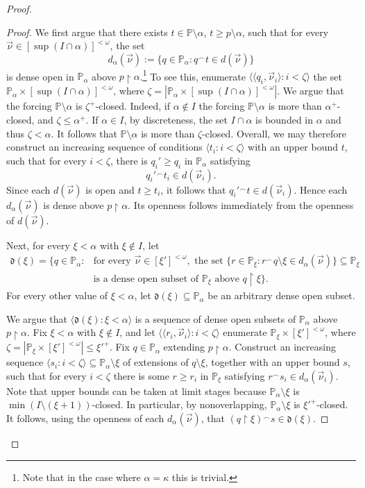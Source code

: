 \documentclass{article}
\theoremstyle{definition}
\theoremstyle{plain}
\newcommand{\po}{\mathbb{P}}
\newcommand{\la}{\langle}
\newcommand{\ra}{\rangle}
\newcommand{\uhr}{\upharpoonright}
\begin{document}
\begin{proof}
\begin{proof}
     We first argue that there exists $t\in \po\setminus\alpha$, $t\geq p\setminus\alpha$, such that for every $\vec{\nu}\in[\sup(I\cap \alpha)]^{<\omega}$, the set
$$d_\alpha(\vec{\nu}):=\{q\in\po_\alpha\colon q{}^\frown t\in d(\vec{\nu})\}$$
is dense open in $\po_\alpha$ above $p\uhr\alpha$.\footnote{Note that in the case where $\alpha = \kappa$ this is trivial.} To see this, enumerate $\langle\langle q_i,\vec{\nu}_i\rangle\colon i<\zeta\rangle$ the set $\po_\alpha\times[\sup(I\cap \alpha)]^{<\omega}$, where $\zeta  = \left|\po_\alpha\times[\sup(I\cap \alpha)]^{<\omega} \right|$. We argue that the forcing $\po\setminus\alpha$ is  $\zeta^+$-closed. Indeed, if $\alpha\notin I$ the forcing $\po\setminus \alpha$ is more than $\alpha^+$-closed, and $\zeta\leq \alpha^+$. If $\alpha\in I$, by discreteness, the set $I\cap \alpha$ is bounded in $\alpha$ and thus $\zeta<\alpha$. It follows that $\po\setminus \alpha$ is more than $\zeta$-closed. Overall, we may therefore construct an increasing sequence of conditions $\langle t_i\colon i<\zeta\rangle$ with an upper bound $t$, such that for every $i<\zeta$, there is $q_i'\geq q_i$ in $\po_\alpha$ satisfying
$$q_i'{}^\frown t_i\in d(\vec{\nu}_i).$$
Since each $d(\vec{\nu})$ is open and $t\geq t_i$, it follows that
$q_i'{}^\frown t\in d(\vec{\nu}_i)$. Hence each $d_\alpha(\vec{\nu})$ is dense above $p\uhr\alpha$. Its openness follows immediately from the openness of $d(\vec{\nu})$.
        
        Next, for every $\xi<\alpha$ with  $\xi\notin I$, let
        \begin{align*}
             \mathfrak{d}(\xi) = \{ q\in \po_\alpha \colon &\text{for every } \vec{\nu}\in [\xi']^{<\omega},\text{ the set }  \{ r\in \po_\xi \colon r{}^\frown q\setminus \xi{} \in d_\alpha(\vec{\nu}) \}\subseteq \po_{\xi} \\
             &\text{is a dense open subset of }\po_\xi \text{ above }q\uhr \xi\}. 
        \end{align*}
        For every other value of $\xi<\alpha$, let $\mathfrak{d}(\xi)\subseteq \po_\alpha$ be an arbitrary dense open subset.
        
        We argue that $\la \mathfrak{d}(\xi)\colon \xi<\alpha\ra$ is a sequence of dense open subsets of $\po_\alpha$ above $p\uhr\alpha$. Fix $\xi<\alpha$ with $\xi \notin I$, and let $\langle\la r_i,\vec{\nu}_i\rangle\colon i<\zeta\ra$ enumerate $\po_\xi\times[\xi']^{<\omega}$, where $\zeta=|\po_\xi\times [\xi']^{<\omega}|\leq {\xi'}^+$. Fix $q\in\po_\alpha$ extending $p\uhr\alpha$. Construct an increasing sequence $\langle s_i\colon i<\zeta\rangle\subseteq\po_\alpha\setminus\xi$ of extensions of $q\setminus\xi$, together with an upper bound $s$, such that for every $i<\zeta$ there is some $r\geq r_i$ in $\po_\xi$ satisfying $r{}^\frown s_i\in d_\alpha(\vec{\nu}_i)$. Note that upper bounds can be taken at limit stages because $\po_\alpha\setminus\xi$ is $\min(I\setminus (\xi+1))$-closed. In particular, by nonoverlapping, $\po_\alpha\setminus \xi$ is ${\xi'}^+$-closed. It follows, using the openness of each $d_\alpha(\vec{\nu})$, that
        $(q\uhr\xi){}^\frown s\in\mathfrak d(\xi)$.
        

\end{proof}
\end{proof}
\end{document}
